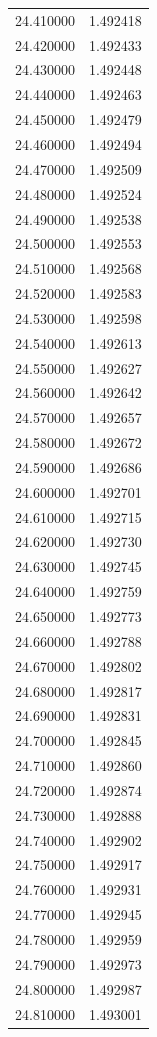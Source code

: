 \begin{tabular}{rr}
24.410000 & 1.492418 \\
24.420000 & 1.492433 \\
24.430000 & 1.492448 \\
24.440000 & 1.492463 \\
24.450000 & 1.492479 \\
24.460000 & 1.492494 \\
24.470000 & 1.492509 \\
24.480000 & 1.492524 \\
24.490000 & 1.492538 \\
24.500000 & 1.492553 \\
24.510000 & 1.492568 \\
24.520000 & 1.492583 \\
24.530000 & 1.492598 \\
24.540000 & 1.492613 \\
24.550000 & 1.492627 \\
24.560000 & 1.492642 \\
24.570000 & 1.492657 \\
24.580000 & 1.492672 \\
24.590000 & 1.492686 \\
24.600000 & 1.492701 \\
24.610000 & 1.492715 \\
24.620000 & 1.492730 \\
24.630000 & 1.492745 \\
24.640000 & 1.492759 \\
24.650000 & 1.492773 \\
24.660000 & 1.492788 \\
24.670000 & 1.492802 \\
24.680000 & 1.492817 \\
24.690000 & 1.492831 \\
24.700000 & 1.492845 \\
24.710000 & 1.492860 \\
24.720000 & 1.492874 \\
24.730000 & 1.492888 \\
24.740000 & 1.492902 \\
24.750000 & 1.492917 \\
24.760000 & 1.492931 \\
24.770000 & 1.492945 \\
24.780000 & 1.492959 \\
24.790000 & 1.492973 \\
24.800000 & 1.492987 \\
24.810000 & 1.493001 \\

\end{tabular}
